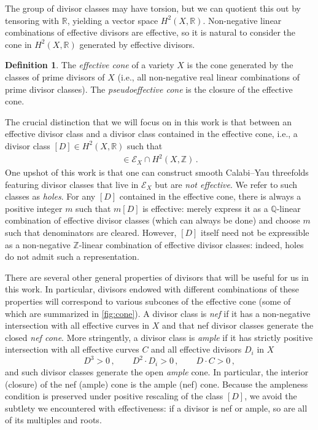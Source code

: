 \documentclass[11pt,dvipsnames]{article}
\theoremstyle{definition}
\newtheorem{definition}[theorem]{Definition}
\begin{document}
The group of divisor classes may have torsion, but we can quotient this out by tensoring with $\mathbb{R}$, yielding a vector space $H^2(X,\mathbb{R})$. Non-negative linear combinations of effective divisors are effective, so it is natural to consider the cone in $H^2(X,\mathbb{R})$ generated by effective divisors.
\begin{definition}
    The \textit{effective cone} of a variety $X$ is the cone generated by the classes of prime divisors of $X$ (i.e., all non-negative real linear combinations of prime divisor classes). The \textit{pseudoeffective cone} is the closure of the effective cone.
\end{definition}
The crucial distinction that we will focus on in this work is that between an effective divisor class and a divisor class contained in the effective cone, i.e., a divisor class $[D] \in H^2(X,\mathbb{R})$ such that 
\begin{align}
    [D] \in \mathcal{E}_X \cap H^2(X,\mathbb{Z})\,.
\end{align}
One upshot of this work is that one can construct smooth Calabi--Yau threefolds featuring divisor classes that live in $\mathcal{E}_X$ but are \textit{not effective}. We refer to such classes as \textit{holes}. For any $[D]$ contained in the effective cone, there is always a positive integer $m$ such that $m[D]$ is effective: merely express it as a $\mathbb{Q}$-linear combination of effective divisor classes (which can always be done) and choose $m$ such that denominators are cleared. However, $[D]$ itself need not be expressible as a non-negative $\mathbb{Z}$-linear combination of effective divisor classes: indeed, holes do not admit such a representation.

There are several other general properties of divisors that will be useful for us in this work. In particular, divisors endowed with different combinations of these properties will correspond to various subcones of the effective cone (some of which are summarized in \cref{fig:cone}). A divisor class is \textit{nef} if it has a non-negative intersection with all effective curves in $X$ and that nef divisor classes generate the closed \textit{nef cone}. More stringently, a divisor class is \textit{ample} if it has strictly positive intersection with all effective curves $C$ and all effective divisors $D_i$ in $X$
\begin{equation}
    D^3> 0\,,\qquad D^2\cdot D_i> 0\,,\qquad D\cdot C> 0\,,
\end{equation}
and such divisor classes generate the open \textit{ample} cone. In particular, the interior (closure) of the nef (ample) cone is the ample (nef) cone. Because the ampleness condition is preserved under positive rescaling of the class $[D]$, we avoid the subtlety we encountered with effectiveness:  if a divisor is nef or ample, so are all of its multiples and roots. 
\end{document}
